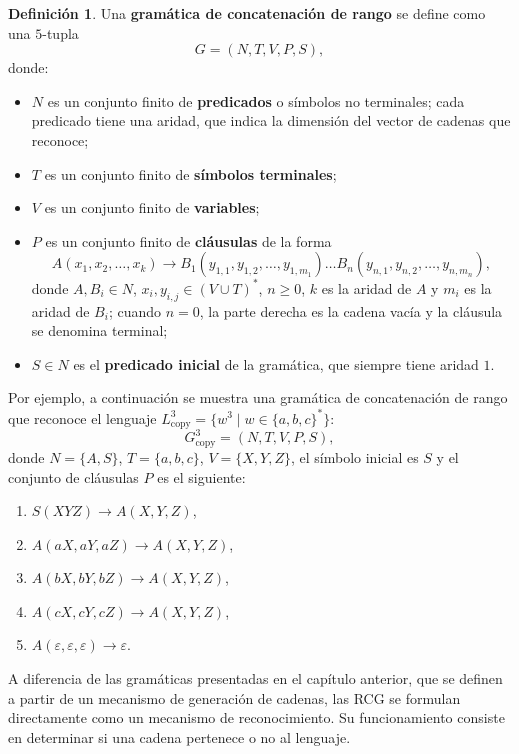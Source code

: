 \documentclass{report}
\theoremstyle{definition}
\newtheorem{definicion}{Definición}[chapter]
\theoremstyle{plain}
\theoremstyle{remark}
\begin{document}
\begin{definicion}
  \label{def:rcg}
  Una \textbf{gramática de concatenación de rango} se define como una
  $5$-tupla
  \[
    G = (N, T, V, P, S),
  \]
  donde:
  \begin{itemize}
    \item $N$ es un conjunto finito de \textbf{predicados} o símbolos no
          terminales; cada predicado tiene una aridad, que indica la dimensión
          del vector de cadenas que reconoce;
    \item $T$ es un conjunto finito de \textbf{símbolos terminales};
    \item $V$ es un conjunto finito de \textbf{variables};
    \item $P$ es un conjunto finito de \textbf{cláusulas} de la forma
          \[
            A(x_1, x_2, \dots, x_k) \to B_1(y_{1,1}, y_{1,2}, \dots, y_{1,m_1})
            \dots B_n(y_{n,1}, y_{n,2}, \dots, y_{n,m_n}),
          \]
          donde $A, B_i \in N$, $x_i, y_{i,j} \in (V \cup T)^*$, $n \ge 0$,
          $k$ es la aridad de $A$ y $m_i$ es la aridad de $B_i$; cuando
          $n = 0$, la parte derecha es la cadena vacía y la cláusula se
          denomina terminal;
    \item $S \in N$ es el \textbf{predicado inicial} de la gramática, que
          siempre tiene aridad $1$.
  \end{itemize}
\end{definicion}

Por ejemplo, a continuación se muestra una gramática de concatenación
de rango que reconoce el lenguaje $L_{\mathrm{copy}}^3 = \{ w^3 \mid w
  \in \{a, b, c\}^* \}$:
\[
  G_{\mathrm{copy}}^3 = (N, T, V, P, S),
\]
donde $N = \{A, S\}$, $T = \{a, b, c\}$, $V = \{X, Y, Z\}$, el símbolo
inicial es $S$ y el conjunto de cláusulas $P$ es el siguiente:
\begin{enumerate}
  \item $S(XYZ) \to A(X, Y, Z)$,
  \item $A(aX, aY, aZ) \to A(X, Y, Z)$,
  \item $A(bX, bY, bZ) \to A(X, Y, Z)$,
  \item $A(cX, cY, cZ) \to A(X, Y, Z)$,
  \item $A(\varepsilon, \varepsilon, \varepsilon) \to \varepsilon$.
\end{enumerate}

A diferencia de las gramáticas presentadas en el capítulo anterior, que
se definen a partir de un mecanismo de generación de cadenas, las RCG
se formulan directamente como un mecanismo de reconocimiento. Su
funcionamiento consiste en determinar si una cadena pertenece o no al
lenguaje.
\end{document}
